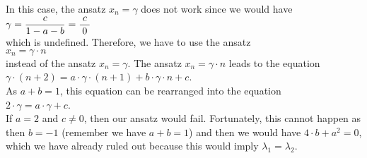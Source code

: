\begin{enumerate}
\begin{enumerate}
            In this case, the ansatz $x_n = \gamma$ does not work since we would have
            \\[0.2cm]
            \hspace*{1.3cm}
            $\displaystyle \gamma = \frac{c}{1 - a - b} = \frac{\;c\;}{0}$
            \\[0.2cm]
            which is undefined.  Therefore, we have to use the ansatz
            \\[0.2cm]
            \hspace*{1.3cm}
            $x_n = \gamma \cdot n$           
            \\[0.2cm]
            instead of the ansatz $x_n = \gamma$.  The ansatz $x_n = \gamma \cdot n$ leads to the equation
            \\[0.2cm]
            \hspace*{1.3cm}
            $\gamma \cdot (n+2) = a \cdot \gamma \cdot (n+1) + b \cdot \gamma \cdot n + c$.
            \\[0.2cm]
            As $a + b = 1$, this equation can be rearranged into the equation
            \\[0.2cm]
            \hspace*{1.3cm}
            $2 \cdot \gamma = a \cdot \gamma + c$.
            \\[0.2cm]
            If $a = 2$ and $c \not= 0$, then our ansatz would fail.  Fortunately, this cannot happen as then
            $b = -1$ (remember we have $a + b = 1$) and then we would have $4 \cdot b + a^2 = 0$,
            which we have already ruled out because this would imply $\lambda_1 = \lambda_2$.


\end{enumerate}
\end{enumerate}
